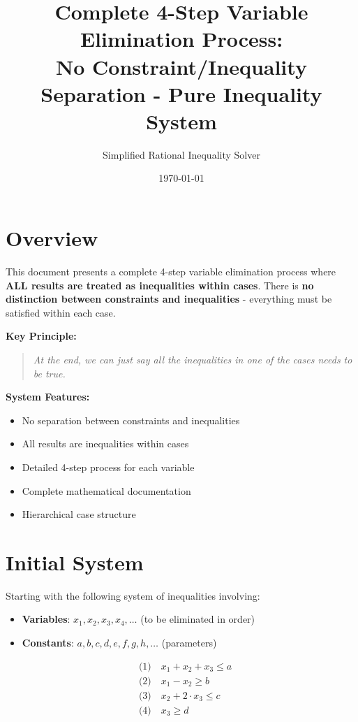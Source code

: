\documentclass{article}
\title{Complete 4-Step Variable Elimination Process: \\
No Constraint/Inequality Separation - Pure Inequality System}
\author{Simplified Rational Inequality Solver}
\date{\today}
\begin{document}
\maketitle

\section{Overview}

This document presents a complete 4-step variable elimination process where
\textbf{ALL results are treated as inequalities within cases}. There is
\textbf{no distinction between constraints and inequalities} - everything
must be satisfied within each case.

\textbf{Key Principle:}
\begin{quote}
\textit{At the end, we can just say all the inequalities in one of the cases needs to be true.}
\end{quote}

\textbf{System Features:}
\begin{itemize}
\item No separation between constraints and inequalities
\item All results are inequalities within cases
\item Detailed 4-step process for each variable
\item Complete mathematical documentation
\item Hierarchical case structure
\end{itemize}

\section{Initial System}

Starting with the following system of inequalities involving:
\begin{itemize}
\item \textbf{Variables}: $x_1, x_2, x_3, x_4, \ldots$ (to be eliminated in order)
\item \textbf{Constants}: $a, b, c, d, e, f, g, h, \ldots$ (parameters)
\end{itemize}

\begin{align}
& \text{(1)} \quad x_{1} + x_{2} + x_{3} \leq a \\
& \text{(2)} \quad x_{1} - x_{2} \geq b \\
& \text{(3)} \quad x_{2} + 2 \cdot x_{3} \leq c \\
& \text{(4)} \quad x_{3} \geq d \\
\end{align}
\end{document}
